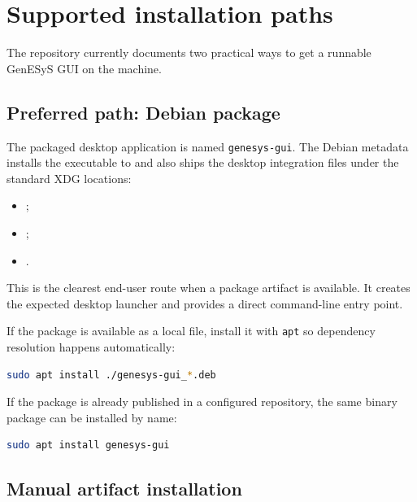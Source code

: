 \section{Supported installation paths}
\label{sec:user-installation-supported-paths}

The repository currently documents two practical ways to get a runnable
GenESyS GUI on the machine.

\subsection{Preferred path: Debian package}
\label{subsec:user-installation-debian-package}

The packaged desktop application is named \texttt{genesys-gui}. The Debian
metadata installs the executable to  and also ships
the desktop integration files under the standard XDG locations:
\begin{itemize}
\item {};
\item {};
\item {}.
\end{itemize}

This is the clearest end-user route when a package artifact is available. It
creates the expected desktop launcher and provides a direct command-line entry
point.

If the package is available as a local file, install it with \texttt{apt} so
dependency resolution happens automatically:

\begin{lstlisting}[language=bash,caption={Installing the local GenESyS Debian package},label={lst:user-installation-local-deb}]
sudo apt install ./genesys-gui_*.deb
\end{lstlisting}

If the package is already published in a configured repository, the same binary
package can be installed by name:

\begin{lstlisting}[language=bash,caption={Installing GenESyS from a repository},label={lst:user-installation-repo-deb}]
sudo apt install genesys-gui
\end{lstlisting}

\subsection{Manual artifact installation}
\label{subsec:user-installation-manual-artifact}

